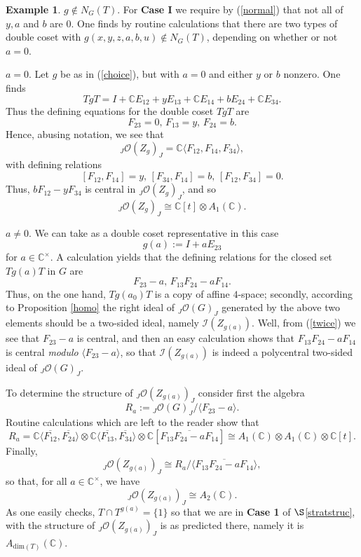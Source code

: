 \documentclass{amsart}
\numberwithin{equation}{section}
\theoremstyle{definition}
\newtheorem{example}[theorem]{Example}
\begin{document}
\begin{example}
 $g \notin N_G(T)$. For {\bf Case I} we require by (\ref{normal}) that not all of $y, a$ and $b$ are $0$. One finds by routine calculations that there are two types of double coset with $g(x,y,z,a,b,u) \notin N_G(T)$, depending on whether or not $a= 0$.
\medskip

 $a= 0$. Let $g$ be as in (\ref{choice}), but with $a= 0$ and either $y$ or $b$ nonzero. One finds
$$ TgT = I + \mathbb{C}E_{12} +yE_{13} + \mathbb{C}E_{14} + bE_{24} + \mathbb{C}E_{34}.$$
Thus the defining equations for the double coset $TgT$ are
$$ F_{23} = 0,\, F_{13} = y,\, F_{24} = b.$$
Hence, abusing notation, we see that 
$$ {}_J\mathcal{O}(Z_g)_J  =  \mathbb{C}\langle F_{12}, F_{14}, F_{34} \rangle,$$
with defining relations
$$[F_{12},F_{14}] = y, \, [F_{34}, F_{14}] = b, \, [F_{12}, F_{34}] = 0.$$
Thus, $bF_{12} - yF_{34}$ is central in ${}_J\mathcal{O}(Z_g)_J$, and so
\begin{equation}\label{mixed} 
{}_J\mathcal{O}(Z_g)_J \cong \mathbb{C}[t] \otimes A_1 (\mathbb{C}).
\end{equation}

 $a\neq 0$. We can take as a double coset representative in this case 
$$ g(a):= I + aE_{23} $$
for $a\in \mathbb{C}^{\times}$. A calculation yields that the defining relations for the closed set $Tg(a) T$ in $G$ are 
$$ F_{23} - a, \,  F_{13}F_{24} - a F_{14}. $$
Thus, on the one hand, $Tg(a_0)T$ is a copy of affine $4$-space; secondly, according to Proposition \ref{homo} the right ideal of ${}_J\mathcal{O}(G)_J$ generated by the above two elements should be a two-sided ideal, namely $\mathcal{I}(Z_{g(a)})$. Well, from (\ref{twice}) we see that $F_{23} - a$ is central, and then an easy calculation shows that $F_{13}F_{24} - aF_{14}$ is central \emph{modulo} $\langle F_{23} - a\rangle$, so that  $\mathcal{I}(Z_{g(a)})$ is indeed a polycentral two-sided ideal of ${}_J\mathcal{O}(G)_J$.

To determine the structure of ${}_J\mathcal{O}(Z_{g(a)})_J$ consider first the algebra 
$$ R_{a}:={}_J\mathcal{O}(G)_J/\langle F_{23} - a \rangle. $$
Routine calculations which are left to the reader show that
$$R_{a}=\mathbb{C}\langle \overline{F_{12}},\overline{F_{24}} \rangle \otimes \mathbb{C}\langle \overline{F_{13}},\overline{F_{34}} \rangle \otimes \mathbb{C}[\overline{F_{13}F_{24} - a F_{14}}]\cong A_1(\mathbb{C}) \otimes A_1(\mathbb{C}) \otimes \mathbb{C}[t].$$
Finally, 
$${}_J\mathcal{O}(Z_{g(a)})_J\cong R_{a}/\langle \overline{F_{13}F_{24} - aF_{14}}\rangle, $$
so that, for all $a \in \mathbb{C}^{\times}$, we have
$${}_J\mathcal{O}(Z_{g(a)})_J \cong  A_2(\mathbb{C}). $$
As one easily checks, $ T \cap T^{g(a)}=\{1\}$ so that we are in {\bf Case 1} of $\S$\ref{stratstruc}, with the structure of ${}_J\mathcal{O}(Z_{g(a)})_J$ is as predicted there, namely it is $A_{\mathrm{dim}(T)}(\mathbb{C})$.
\medskip


\end{example}
\end{document}

